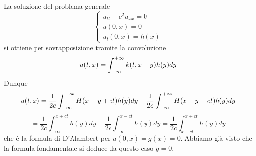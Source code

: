 La soluzione del problema generale
\[
	\left\{
	\begin{array}{l}
		u_{tt}-c^2u_{xx}=0\\
		u(0,x)=0\\
		u_t(0,x)=h(x)
	\end{array}
	\right.
\]
si ottiene per sovrapposizione tramite la convoluzione
\[
	u(t,x)= \int_{- \infty}^{+ \infty} k(t,x-y)h(y)dy
\]
Dunque
\[
	u(t,x)= \frac{1}{2c} \int_{- \infty}^{+ \infty} H(x-y+ct) h(y) dy -
	\frac{1}{2c} \int_{- \infty}^{+ \infty} H(x-y-ct) h(y) dy
\]
\[
	=\frac{1}{2c} \int_{-\infty}^{x+ct} h(y) dy -
	\frac{1}{2c} \int_{-\infty}^{x-ct} h(y) dy
	=\frac{1}{2c} \int_{x-ct}^{x+ct} h(y) dy
\]
che \`e la formula di D'Alambert per $u(0,x)=g(x)=0$. Abbiamo gi\`a visto che
la formula fondamentale si deduce da questo caso $g=0$.
